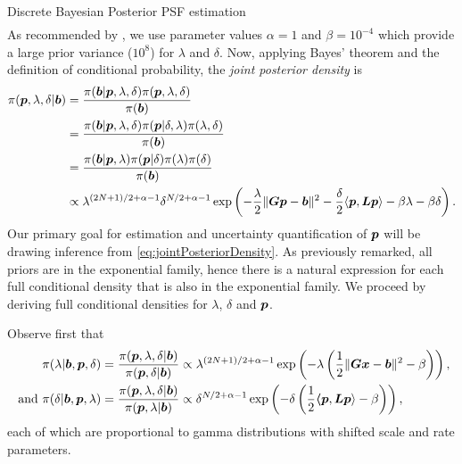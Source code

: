 \begin{chapter}{Discrete Bayesian Posterior PSF estimation}
\begin{align}
\end{align}
As recommended by \citep{higdon2006primer}, we use parameter values $\alpha = 1$ and $\beta =  10^{-4}$ which provide a large prior variance ($10^8$) for $\lambda$ and $\delta$. 
Now, applying Bayes' theorem and the definition of conditional probability, the \emph{joint posterior density} is
\begin{align}
  \pi(\mbox{\boldmath$p$},\lambda,\delta|\mbox{\boldmath$b$}) 
    &= \frac{\pi(\mbox{\boldmath$b$}|\mbox{\boldmath$p$},\lambda,\delta) \pi(\mbox{\boldmath$p$},\lambda,\delta)}{\pi(\mbox{\boldmath$b$})} \nonumber \\
    &= \frac{\pi(\mbox{\boldmath$b$}|\mbox{\boldmath$p$},\lambda,\delta) \pi(\mbox{\boldmath$p$}| \delta,\lambda) \pi(\lambda,\delta)}{\pi(\mbox{\boldmath$b$})} \nonumber \\
    &= \frac{\pi(\mbox{\boldmath$b$}|\mbox{\boldmath$p$},\lambda) \pi(\mbox{\boldmath$p$}| \delta) \pi(\lambda)\pi(\delta)}{\pi(\mbox{\boldmath$b$})} \nonumber \\
    &\propto \lambda^{(2N+1)/2+\alpha-1}\delta^{N/2+\alpha-1} \exp\left(-\frac{\lambda}{2}\|\mbox{\boldmath$Gp$} - \mbox{\boldmath$b$}\|^2 - \frac{\delta}{2}\langle \mbox{\boldmath$p$}, \mbox{\boldmath$L$} \mbox{\boldmath$p$}\rangle - \beta\lambda - \beta\delta \right). \label{eq:jointPosteriorDensity}
\end{align}
Our primary goal for estimation and uncertainty quantification of $\mbox{\boldmath$p$}$ will be drawing inference from \eqref{eq:jointPosteriorDensity}.
As previously remarked, all priors are in the exponential family, hence there is a natural expression for each full conditional density that is also in the exponential family.
We proceed by deriving full conditional densities for $\lambda$, $\delta$ and $\mbox{\boldmath$p$}$.

Observe first that
\begin{align}
  \pi(\lambda| \mbox{\boldmath$b$},\mbox{\boldmath$p$},\delta) 
  &= \frac{\pi(\mbox{\boldmath$p$},\lambda,\delta|\mbox{\boldmath$b$})}{\pi(\mbox{\boldmath$p$},\delta|\mbox{\boldmath$b$}) } 
  \propto \lambda^{(2N+1)/2+\alpha-1}\exp\left(-\lambda\left(\frac{1}{2}\|\mbox{\boldmath$Gx$} - \mbox{\boldmath$b$}\|^2 - \beta\right)  \right), \nonumber\\
\text{ and }\pi(\delta| \mbox{\boldmath$b$},\mbox{\boldmath$p$},\lambda) 
  &= \frac{\pi(\mbox{\boldmath$p$},\lambda,\delta|\mbox{\boldmath$b$})}{\pi(\mbox{\boldmath$p$},\lambda|\mbox{\boldmath$b$}) } 
  \propto \delta^{N/2+\alpha-1}\exp\left(-\delta\left(\frac{1}{2}\mbox{\boldmath$\langle$} \mbox{\boldmath$p$},\mbox{\boldmath$L$}\mbox{\boldmath$p$} \rangle- \beta\right)  \right), \label{eq:lambdaDeltaConditional} 
\end{align}
each of which are proportional to gamma distributions with shifted scale and rate parameters.
 

\end{chapter}
